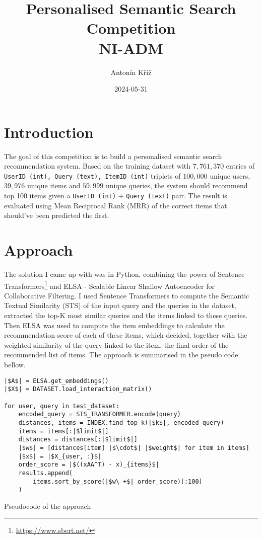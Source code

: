 \documentclass{article}
\title{Personalised Semantic Search Competition\\{\large{NI-ADM}}}
\author{Antonín Kříž}
\date{2024-05-31}
\begin{document}
\maketitle

\section{Introduction}

The goal of this competition is to build a personalised semantic search recommendation system. Based on the training dataset with $7,761,370$ entries of \texttt{UserID~(int), Query~(text), ItemID~(int)} triplets of $100,000$ unique users, $39,976$ unique items and $59,999$ unique queries, the system should recommend top 100 items given a \texttt{UserID~(int)} + \texttt{Query~(text)} pair. The result is evaluated using Mean Reciprocal Rank\cite{wikimrr} (MRR) of the correct items that should've been predicted the first.

\section{Approach}

The solution I came up with was in Python, combining the power of Sentence Transformers\footnote{\url{https://www.sbert.net/}}\cite{sts, sbert} and ELSA\cite{elsa} - Scalable Linear Shallow Autoencoder for Collaborative Filtering. I used Sentence Transformers to compute the Semantic Textual Similarity (STS) of the input query and the queries in the dataset, extracted the top-K most similar queries and the items linked to these queries. Then ELSA was used to compute the item embeddings to calculate the recommendation score of each of these items, which decided, together with the weighted similarity of the query linked to the item, the final order of the recommended list of items. The approach is summarised in the pseudo code bellow.

\begin{listing}[!ht]
\begin{verbatim}
|$A$| = ELSA.get_embeddings()
|$X$| = DATASET.load_interaction_matrix()

for user, query in test_dataset:
    encoded_query = STS_TRANSFORMER.encode(query)
    distances, items = INDEX.find_top_k(|$k$|, encoded_query)
    items = items[:|$limit$|]
    distances = distances[:|$limit$|]
    |$w$| = [distances[item] |$\cdot$| |$weight$| for item in items]
    |$x$| = |$X_{user, :}$|
    order_score = |$((xAA^T) - x)_{items}$|
    results.append(
        items.sort_by_score(|$w\ +$| order_score)[:100]
    )
\end{verbatim}
\caption{Pseudocode of the approach}
\label{code:pseudo}
\end{listing}
\end{document}
